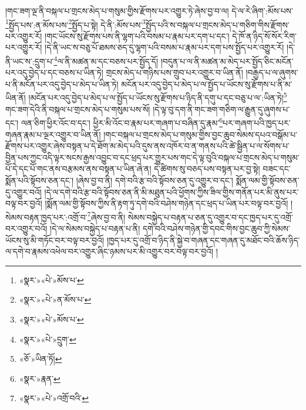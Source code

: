 །གང་ཟག་ལྔ་ནི་བསྐལ་པ་གྲངས་མེད་པ་གསུམ་གྱིས་རྫོགས་པར་འགྱུར་ཏེ་ཞེས་བྱ་བ་ལ། དེ་ལ་རེ་ཞིག་:མོས་པས་\footnote{«སྣར་»«པེ་»མོས་པ་}སྤྱོད་པས་:ན་མོས་པས་\footnote{«སྣར་»«པེ་»ན་མོས་པ་}སྤྱོད་པ་སྟེ། དེ་ནི་:མོས་པས་\footnote{«སྣར་»«པེ་»མོས་པ་}སྤྱོད་པའི་ས་བསྐལ་པ་གྲངས་མེད་པ་གཅིག་གིས་རྫོགས་པར་འགྱུར་རོ། །གང་ཡོངས་སུ་རྫོགས་པས་ནི་ལྷག་པའི་བསམ་པ་རྣམ་པར་དག་པ་དང་། དེ་ཁོ་ན་ཉིད་སོ་སོར་རིག་པར་འགྱུར་རོ། །དེ་ནི་ཡང་ས་བཅུ་པོ་ཐམས་ཅད་དུ་ལྷག་པའི་བསམ་པ་རྣམ་པར་དག་པས་སྤྱོད་པར་འགྱུར་རོ། །དེ་ནི་ཡང་ས་:དྲུག་པ་\footnote{«སྣར་»«པེ་»དྲུག་}ལ་ནི་མཚན་མ་དང་བཅས་པར་སྤྱོད་དོ། །བདུན་པ་ལ་ནི་མཚན་མ་མེད་པར་སྤྱོད་ཅིང་མངོན་པར་འདུ་བྱེད་པ་དང་བཅས་པ་ཡིན་ཏེ། གྲངས་མེད་པ་གཉིས་པས་གྲུབ་པར་འགྱུར་བ་ཡིན་ནོ། །བརྒྱད་པ་ལ་ཞུགས་པ་ནི་མངོན་པར་འདུ་བྱེད་པ་མེད་པ་ཡིན་ཏེ། མངོན་པར་འདུ་བྱེད་པ་མེད་པ་ལ་སྤྱོད་པ་ཡོངས་སུ་རྫོགས་པ་ནི་མ་ཡིན་ནོ། །མངོན་པར་འདུ་བྱེད་པ་མེད་པ་ལ་སྤྱོད་པ་ཡོངས་སུ་རྫོགས་པ་ཉིད་ནི་དགུ་པ་དང་བཅུ་པ་ལ་:ཡིན་ཏེ།\footnote{«ཅོ་»ཡིན་ཏོ།} གང་ཟག་དེའི་ནི་བསྐལ་པ་གྲངས་མེད་པ་གསུམ་པས་སོ། །དེ་ལྟ་བུ་དག་ནི་གང་ཟག་གཅིག་ལ་རྒྱུན་དུ་ཞུགས་པ་དང་། ལན་ཅིག་ཕྱིར་འོང་བ་དང་། ཕྱིར་མི་འོང་བ་རྣམ་པར་གཞག་པ་བཞིན་དུ་རྣམ་\footnote{«སྣར་»རྣན་}པར་གཞག་པའི་ཁྱད་པར་གཞན་རྣམ་པ་ལྔར་འགྱུར་བ་ཡིན་ནོ། །གང་བསྐལ་པ་གྲངས་མེད་པ་གསུམ་གྱིས་བྱང་ཆུབ་སེམས་དཔའ་བསྒོམ་པ་རྫོགས་པར་འགྱུར་ཞེས་བསྟན་པ་དེ་ཐོག་མ་མེད་པའི་དུས་ནས་འཁོར་བ་ན་གནས་པའི་ཚེ་སྦྱིན་པ་ལ་སོགས་པ་བྱིན་པས་ཀྱང་འདི་ལྟར་སངས་རྒྱས་འབྱུང་བ་དང་ཕྲད་པར་གྱུར་པས་གང་དེ་ལྟ་བུའི་བསྐལ་པ་གྲངས་མེད་པ་གསུམ་པོ་དེ་དང་པོ་གང་ནས་བརྩམས་ནས་བསྟན་པ་ཡིན་ཞེ་ན། དེ་ཚིགས་སུ་བཅད་པས་བསྟན་པར་བྱ་སྟེ། བཟང་དང་སྨོན་པའི་སྟོབས་ཅན་དང་། །ཞེས་བྱ་བ་ནི། དགེ་བའི་རྩ་བའི་སྟོབས་ཅན་དུ་འགྱུར་བ་དང་། སྨོན་ལམ་གྱི་སྟོབས་ཅན་དུ་འགྱུར་བའོ། །དེ་ལ་དགེ་བའི་རྩ་བའི་སྟོབས་ཅན་ནི་མི་མཐུན་པའི་ཕྱོགས་ཀྱིས་ཟིལ་གྱིས་གནོན་པར་མི་ནུས་པར་བལྟ་བར་བྱའོ། །སྨོན་ལམ་གྱི་སྟོབས་ཀྱིས་ནི་རྟག་ཏུ་དགེ་བའི་བཤེས་གཉེན་དང་ཕྲད་པ་ཡིན་པར་བལྟ་བར་བྱའོ། །སེམས་བརྟན་ཁྱད་པར་:འགྲོ་བ་\footnote{«སྣར་»«པེ་»འགྲོ་བའི་}ཞེས་བྱ་བ་ནི། སེམས་བསྐྱེད་པ་བརྟན་པ་ཅན་དུ་འགྱུར་བ་དང་ཁྱད་པར་དུ་འགྲོ་བར་འགྱུར་བའོ། །དེ་ལ་སེམས་བསྐྱེད་པ་བརྟན་པ་ནི། དགེ་བའི་བཤེས་གཉེན་གྱི་དབང་གིས་བྱང་ཆུབ་ཀྱི་སེམས་ཡོངས་སུ་མི་གཏོང་བར་བལྟ་བར་བྱའོ། །ཁྱད་པར་དུ་འགྲོ་བ་ཉིད་ནི་སྐྱེ་བ་གཞན་དང་གཞན་དུ་མཐོང་བའི་ཆོས་ཉིད་ལ་དགེ་བ་རྣམས་འཕེལ་བར་འགྱུར་ཞིང་ཉམས་པར་མི་འགྱུར་བར་བལྟ་བར་བྱའོ། །
